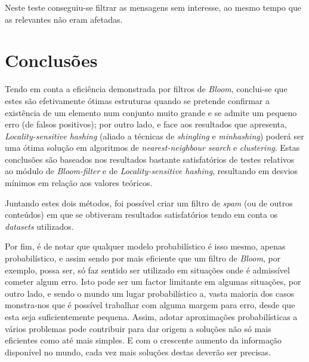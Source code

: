 \documentclass[a4paper,11pt,openright,oneside]{report}
\begin{document}
Neste teste conseguiu-se filtrar as mensagens sem interesse, ao mesmo tempo que as relevantes não eram afetadas.

\chapter{Conclusões}
\label{chap.conclusões}

Tendo em conta a eficiência demonstrada por filtros de \textit{Bloom}, conclui-se que estes são efetivamente ótimas estruturas quando se pretende confirmar a existência de um elemento num conjunto muito grande e se admite um pequeno erro (de falsos positivos); por outro lado, e face aos resultados que apresenta, \textit{Locality-sensitive hashing} (aliado a técnicas de \textit{shingling} e \textit{minhashing}) poderá ser uma ótima solução em algoritmos de \textit{nearest-neighbour search} e \textit{clustering}. Estas conclusões são baseados nos resultados bastante satisfatórios de testes relativos ao módulo de \textit{Bloom-filter} e de \textit{Locality-sensitive hashing}, resultando em desvios mínimos em relação aos valores teóricos.

Juntando estes dois métodos, foi possível criar um filtro de \textit{spam} (ou de outros conteúdos) em que se obtiveram resultados satisfatórios tendo em conta os \textit{datasets} utilizados.

Por fim, é de notar que qualquer modelo probabilístico é isso mesmo, apenas probabilístico, e assim sendo por mais eficiente que um filtro de \textit{Bloom}, por exemplo, possa ser, só faz sentido ser utilizado em situações onde é admissível cometer algum erro. Isto pode ser um factor limitante em algumas situações, por outro lado, e sendo o mundo um lugar probabilístico a, vasta maioria dos casos monstra-nos que é possível trabalhar com alguma margem para erro, desde que esta seja suficientemente pequena. Assim, adotar aproximações probabilísticas a vários problemas pode contribuir para dar origem a soluções não só mais eficientes como até mais simples. E com o crescente aumento da informação disponível no mundo, cada vez mais soluções destas deverão ser precisas.

\maketitle
\nocite{*}

\printbibliography[title={Referências}]
\end{document}
